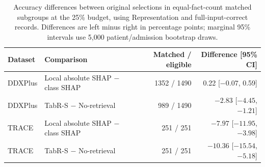 \begin{table}[!tbp]\centering\footnotesize
\caption{Accuracy differences between original selections in equal-fact-count matched subgroups at the 25\% budget, using Representation and full-input-correct records. Differences are left minus right in percentage points; marginal 95\% intervals use 5,000 patient/admission bootstrap draws.}
\label{tab:equal-fact-check}
\begin{tabular}{llrr}\toprule
Dataset & Comparison & Matched / eligible & Difference [95\% CI]\\\midrule
DDXPlus & Local absolute SHAP $-$ class SHAP & 1352 / 1490 & 0.22 [$-0.07$, 0.59]\\
DDXPlus & TabR-S $-$ No-retrieval & 989 / 1490 & $-2.83$ [$-4.45$, $-1.21$]\\
TRACE & Local absolute SHAP $-$ class SHAP & 251 / 251 & $-7.97$ [$-11.95$, $-3.98$]\\
TRACE & TabR-S $-$ No-retrieval & 251 / 251 & $-10.36$ [$-15.54$, $-5.18$]\\
\bottomrule\end{tabular}\end{table}
